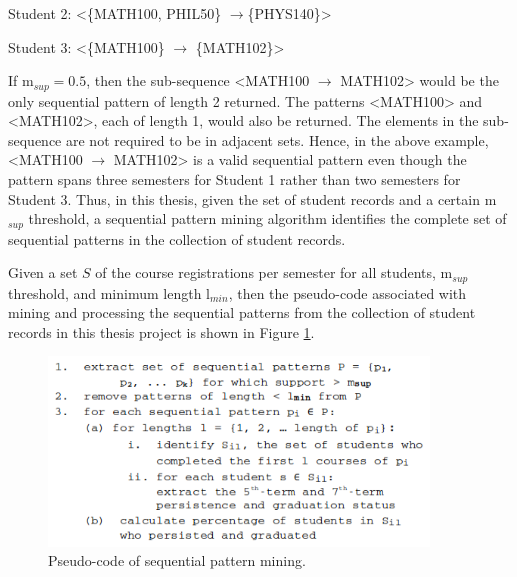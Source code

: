 Student 2: \textless\{MATH100, PHIL50\} $\rightarrow$\{PHYS140\}\textgreater

Student 3: \textless\{MATH100\} $\rightarrow$ \{MATH102\}\textgreater

If m$_{sup}=0.5$, then the sub-sequence \textless MATH100  $\rightarrow$ MATH102\textgreater{} would be the only sequential pattern of length 2 returned.  The patterns \textless MATH100\textgreater{} and \textless MATH102\textgreater{}, each of length 1, would also be returned.  The elements in the sub-sequence are not required to be in adjacent sets.  Hence, in the above example, \textless MATH100  $\rightarrow$ MATH102\textgreater{} is a valid sequential pattern even though the pattern spans three semesters for Student 1 rather than two semesters for Student 3.  Thus, in this thesis, given the set of student records and a certain m$_{sup}$ threshold, a sequential pattern mining algorithm identifies the complete set of sequential patterns in the collection of student records.  

Given a  set $S$ of the course registrations per semester for all students, m$_{sup}$ threshold, and minimum length l$_{min}$, then the pseudo-code associated with mining and processing the sequential patterns from the collection of student records in this thesis project is shown in Figure \ref{pseudocode}. 

\begin{figure}[htbp]
\centering
\includegraphics[width=0.9\textwidth]{figures/pseudocode_spm.png}
\caption{Pseudo-code of sequential pattern mining.}
\label{pseudocode}
\end{figure}


